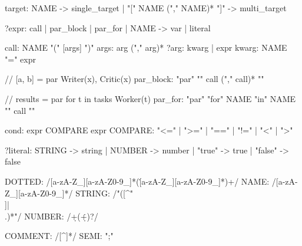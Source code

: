 \begin{plaincode}[title=grammar.lark]
target: NAME                         -> single_target
      | "[" NAME ("," NAME)* "]"     -> multi_target

?expr: call
     | par_block
     | par_for
     | NAME                          -> var
     | literal

call: NAME "(" [args] ")"
args: arg ("," arg)*
?arg: kwarg | expr
kwarg: NAME "=" expr

// [a, b] = par { Writer(x), Critic(x) }
par_block: "par" "{" call ("," call)* "}"

// results = par for t in tasks { Worker(t) }
par_for: "par" "for" NAME "in" NAME "{" call "}"

cond: expr COMPARE expr
COMPARE: "<=" | ">=" | "==" | "!=" | "<" | ">"

?literal: STRING -> string
        | NUMBER -> number
        | "true"  -> true
        | "false" -> false

DOTTED: /[a-zA-Z_][a-zA-Z0-9_]*(\.[a-zA-Z_][a-zA-Z0-9_]*)+/
NAME: /[a-zA-Z_][a-zA-Z0-9_]*/
STRING: /"([^"\\]|\\.)*"/
NUMBER: /\d+(\.\d+)?/

COMMENT: /\/\/[^\n]*/
SEMI: ";"
\end{plaincode}
